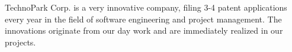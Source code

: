 
TechnoPark Corp. is a very innovative company, filing 3-4 patent
applications every year in the field of software engineering
and project management. The innovations originate from our day work and
are immediately realized in our projects.
